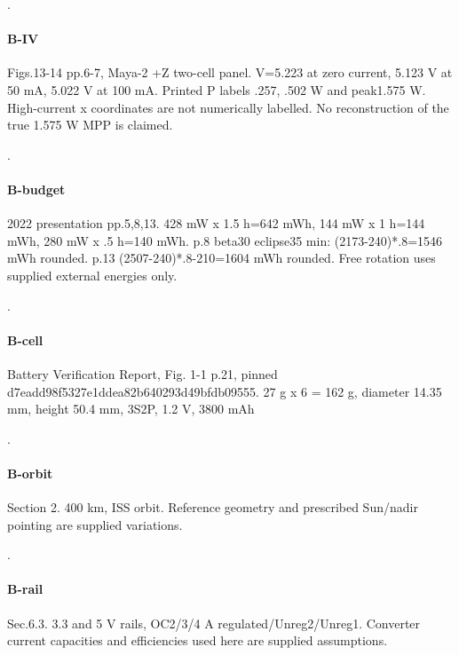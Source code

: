 \citep{cots-mission_azur_space_3g30a_review_legacy_ds}.

\paragraph{B-IV} Figs.13-14 pp.6-7,\allowbreak{} Maya-2 +Z two-cell panel. V=5.223 at zero current,\allowbreak{} 5.123 V at 50 mA,\allowbreak{} 5.022 V at 100 mA. Printed P labels .257,\allowbreak{} .502 W and peak1.575 W. High-current x coordinates are not numerically labelled. No reconstruction of the true 1.575 W MPP is claimed.

\citep{shrestha2021birdssafety}.

\paragraph{B-budget} 2022 presentation pp.5,\allowbreak{}8,\allowbreak{}13. 428 mW x 1.5 h=642 mWh,\allowbreak{} 144 mW x 1 h=144 mWh,\allowbreak{} 280 mW x .5 h=140 mWh. p.8 beta30 eclipse35 min: (2173-240)*.8=1546 mWh rounded. p.13 (2507-240)*.8-210=1604 mWh rounded. Free rotation uses supplied external energies only.

\citep{shrestha2022birds4powerbudget}.

\paragraph{B-cell} Battery Verification Report,\allowbreak{} Fig. 1-1 p.21,\allowbreak{} pinned d7eadd98\allowbreak{}f5327e1d\allowbreak{}dea82b64\allowbreak{}0293d49b\allowbreak{}fdb09555. 27 g x 6 = 162 g,\allowbreak{} diameter 14.35 mm,\allowbreak{} height 50.4 mm,\allowbreak{} 3S2P,\allowbreak{} 1.2 V,\allowbreak{} 3800 mAh

\citep{birds2021batteryverification}.

\paragraph{B-orbit} Section 2. 400 km,\allowbreak{} ISS orbit. Reference geometry and prescribed Sun/nadir pointing are supplied variations.

\citep{jara2022birdsepsdataset}.

\paragraph{B-rail} Sec.6.3. 3.3 and 5 V rails,\allowbreak{} OC2/3/4 A regulated/Unreg2/Unreg1. Converter current capacities and efficiencies used here are supplied assumptions.

